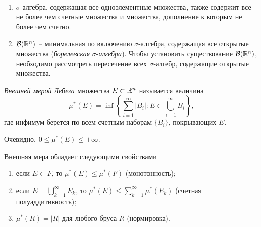 \begin{example}~

    \begin{enumerate}
        \item $\sigma$-алгебра, содержащая все одноэлементные множества, также содержит все не более чем счетные множества и множества, дополнение к которым не более чем счетно.
        \item $\mathcal{B}(\mathbb{R}^{n})$ -- минимальная по включению $\sigma$-алгебра, содержащая все открытые множества (\textit{борелевская} $\sigma$-\textit{алгебра}). Чтобы установить существование $\mathcal{B}(\mathbb{R}^{n})$, необходимо рассмотреть пересечение всех $\sigma$-алгебр, содержащие открытые множества.
    \end{enumerate}
\end{example}


\begin{definition}
    \textit{Внешней мерой Лебега} множества $E \subset \mathbb{R}^{n}$ называется величина
    \[\mu^{*}(E) = \inf\left\{\sum_{i = 1}^{\infty}|B_{i}|: E \subset \bigcup_{i = 1}^{\infty}B_{i}\right\},\]
    где инфимум берется по всем счетным наборам $\{B_{i}\}$, покрывающих $E$.

    Очевидно, $0 \leq \mu^{*}(E) \leq +\infty$.
\end{definition}

\begin{theorem}
    Внешняя мера обладает следующими свойствами
    \begin{enumerate}
        \item если $E \subset F$, то $\mu^{*}(E) \leq \mu^{*}(F)$ (монотонность);
        \item если $E = \bigcup_{k = 1}^{\infty} E_{k}$, то $\mu^{*}(E) \leq \sum_{k = 1}^{\infty}\mu^{*}(E_{k})$ (счетная полуаддитивность);
        \item $\mu^{*}(R) = |R|$ для любого бруса $R$ (нормировка).
    \end{enumerate}
\end{theorem}

